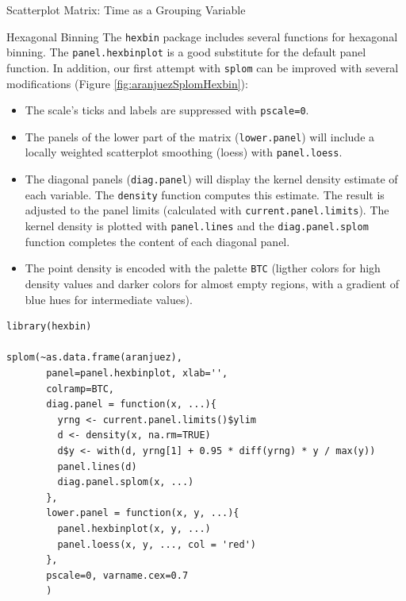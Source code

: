 \documentclass[presentation]{beamer}
\begin{document}
\begin{frame}[fragile,label=sec-1]{Scatterplot Matrix: Time as a Grouping Variable}
\begin{block}{Hexagonal Binning}
The \texttt{hexbin} package \cite{Carr.Lewin-Koh.ea2013} includes several
functions for hexagonal binning.  The \texttt{panel.hexbinplot} is a good
substitute for the default panel function. In addition, our first
attempt with \texttt{splom} can be improved with several modifications
(Figure \ref{fig:aranjuezSplomHexbin}):
\begin{itemize}
\item The scale's ticks and labels are suppressed with \texttt{pscale=0}.
\item The panels of the lower part of the matrix (\texttt{lower.panel}) will
include a locally weighted scatterplot smoothing (loess) with
\texttt{panel.loess}.
\item The diagonal panels (\texttt{diag.panel}) will display the kernel
density estimate of each variable. The \texttt{density} function
computes this estimate. The result is adjusted to the panel
limits (calculated with \texttt{current.panel.limits}). The kernel
density is plotted with \texttt{panel.lines} and the \texttt{diag.panel.splom}
function completes the content of each diagonal panel.
\item The point density is encoded with the palette \texttt{BTC} (ligther
colors for high density values and darker colors for almost
empty regions, with a gradient of blue hues for intermediate values).
\end{itemize}


\lstset{language=R,numbers=none}
\begin{lstlisting}
library(hexbin)

splom(~as.data.frame(aranjuez),
	   panel=panel.hexbinplot, xlab='',
	   colramp=BTC,
	   diag.panel = function(x, ...){
	     yrng <- current.panel.limits()$ylim
	     d <- density(x, na.rm=TRUE)
	     d$y <- with(d, yrng[1] + 0.95 * diff(yrng) * y / max(y))
	     panel.lines(d)
	     diag.panel.splom(x, ...)
	   },
	   lower.panel = function(x, y, ...){
	     panel.hexbinplot(x, y, ...)
	     panel.loess(x, y, ..., col = 'red')
	   },
	   pscale=0, varname.cex=0.7
	   )
\end{lstlisting}


\end{block}
\end{frame}
\end{document}
